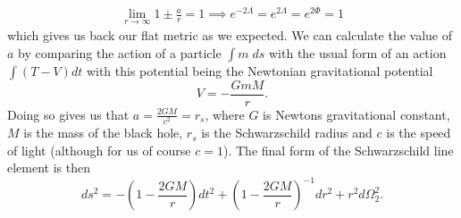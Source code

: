 \documentclass[12pt]{article}
\numberwithin{equation}{section}
\numberwithin{figure}{section}
\begin{document}
\begin{align}
\lim_{r\to\infty}1\pm \frac{a}{r} =1 \implies e^{-2\Lambda}=e^{2\Lambda}=e^{2\Phi} =1
\end{align}
which gives us back our flat metric as we expected. We can calculate the value of $a$ by comparing the action of a particle $\int m \;ds$ with the usual form of an action $\int (T-V)dt$ with this potential being the Newtonian gravitational potential 
\begin{equation}
	V=-\frac{GmM}{r}.
\end{equation} Doing so gives us that $a=\frac{2GM}{c^2}=r_s$, where $G$ is Newtons gravitational constant, $M$ is the mass of the black hole, $r_s$ is the Schwarzschild radius and $c$ is the speed of light (although for us of course $c=1$). The final form of the Schwarzschild line element is then
\begin{equation}
	ds^2 = -\left(1- \frac{2GM}{r}\right)dt^2 +\left(1- \frac{2GM}{r}\right)^{-1}dr^2 + r^2d\Omega^2_{2}.
\end{equation}
\end{document}
